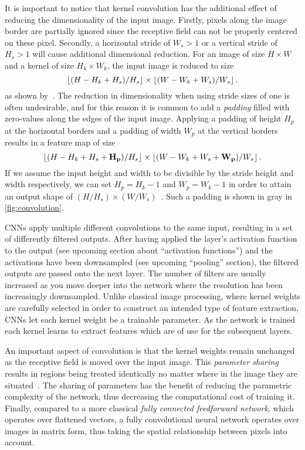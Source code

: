 It is important to notice that kernel convolution has the additional effect of reducing the dimensionality of the input image.
Firstly, pixels along the image border are partially ignored since the receptive field can not be properly centered on these pixel.
Secondly, a horizontal stride of $W_s > 1$ or a vertical stride of $H_s > 1$ will cause additional dimensional reduction.
For an image of size $H \times W$ and a kernel of size $H_k \times W_k$, the input image is reduced to size
%
\begin{equation*}
  \left\lfloor (H - H_k + H_s) / H_s \right\rfloor
  \times
  \left\lfloor (W - W_k + W_s) / W_s \right\rfloor.
\end{equation*}
%
as shown by~\cite{dive-into-deep-learning}.
The reduction in dimensionality when using stride sizes of one is often undesirable, and for this reason it is common to add a \textit{padding} filled with zero-values along the edges of the input image.
Applying a padding of height $H_p$ at the horizontal borders and a padding of width $W_p$ at the vertical borders results in a feature map of size
%
\begin{equation*}
  \left\lfloor (H - H_k + H_s + \mathbf{H_p}) / H_s \right\rfloor
  \times
  \left\lfloor (W - W_k + W_s + \mathbf{W_p}) / W_s \right\rfloor.
\end{equation*}
%
If we assume the input height and width to be divisible by the stride height and width respectively, we can set $H_p = H_k - 1$ and $W_p = W_k - 1$ in order to attain an output shape of $(H / H_s) \times (W / W_s)$~\cite{dive-into-deep-learning}.
Such a padding is shown in gray in \cref{fig:convolution}.

CNNs apply multiple different convolutions to the same input, resulting in a set of differently filtered outputs.
After having applied the layer's activation function to the output (see upcoming section about \enquote{activation functions}) and the activations have been downsampled (see upcoming \enquote{pooling} section), the filtered outputs are passed onto the next layer.
The number of filters are usually increased as you move deeper into the network where the resolution has been increasingly downsampled.
Unlike classical image processing, where kernel weights are carefully selected in order to construct an intended type of feature extraction, CNNs let each kernel weight be a trainable parameter.
As the network is trained each kernel learns to extract features which are of use for the subsequent layers.

An important aspect of convolution is that the kernel weights remain unchanged as the receptive field is moved over the input image.
This \textit{parameter sharing} results in regions being treated identically no matter where in the image they are situated~\cite{visint-cnn}.
The sharing of parameters has the benefit of reducing the parametric complexity of the network, thus decreasing the computational cost of training it.
Finally, compared to a more classical \textit{fully connected feedforward network}, which operates over flattened vectors, a fully convolutional neural network operates over images in matrix form, thus taking the spatial relationship between pixels into account.
